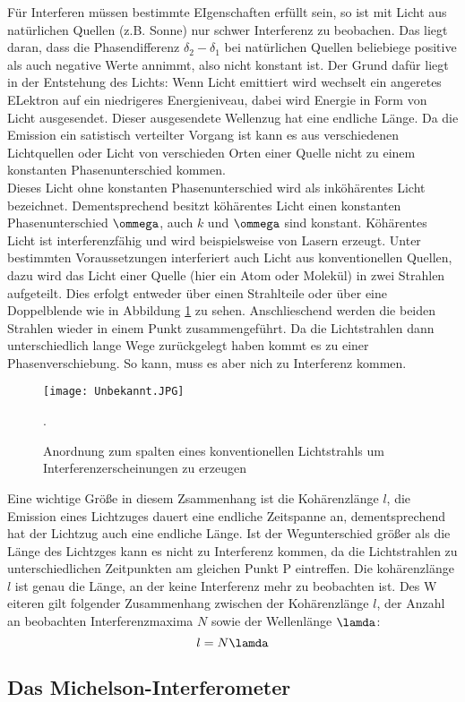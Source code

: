 Für Interferen müssen bestimmte EIgenschaften erfüllt sein, so ist mit Licht aus
natürlichen Quellen (z.B. Sonne) nur schwer Interferenz zu beobachen. Das liegt daran, dass
die Phasendifferenz $\delta_2-\delta_1$ bei natürlichen Quellen beliebiege positive als
auch negative Werte annimmt, also nicht konstant ist. Der Grund dafür liegt in der
Entstehung des Lichts: Wenn Licht emittiert wird wechselt ein angeretes ELektron auf ein
niedrigeres Energieniveau, dabei wird Energie in Form von Licht ausgesendet. Dieser ausgesendete
Wellenzug hat eine endliche Länge. Da die Emission ein satistisch verteilter Vorgang ist
kann es aus verschiedenen Lichtquellen oder Licht von verschieden Orten einer Quelle nicht zu
einem konstanten Phasenunterschied kommen.\\

Dieses Licht ohne konstanten Phasenunterschied wird als inköhärentes Licht bezeichnet.
Dementsprechend besitzt köhärentes Licht einen konstanten Phasenunterschied $\ommega$, auch
$k$ und $\ommega$ sind konstant.
Köhärentes Licht ist interferenzfähig und wird beispielsweise von Lasern erzeugt.
Unter bestimmten Voraussetzungen interferiert auch Licht aus konventionellen Quellen,
dazu wird das Licht einer Quelle (hier ein Atom oder Molekül) in zwei Strahlen aufgeteilt.
Dies erfolgt entweder über einen Strahlteile oder über eine Doppelblende wie in
Abbildung \ref{fig:blende} zu sehen. Anschlieschend werden die beiden Strahlen wieder in
einem Punkt zusammengeführt. Da die Lichtstrahlen dann unterschiedlich lange Wege zurückgelegt haben
kommt es zu einer Phasenverschiebung. So kann, muss es aber nich zu Interferenz kommen.
\begin{figure}[H]
  \centering
  \texttt{[image: Unbekannt.JPG]}
  \caption{Anordnung zum spalten eines konventionellen Lichtstrahls um Interferenzerscheinungen zu erzeugen}
  \label{fig:blende}.
\end{figure}
Eine wichtige Größe in diesem Zsammenhang ist die Kohärenzlänge $l$, die Emission eines 
Lichtzuges dauert eine endliche Zeitspanne an, dementsprechend hat der Lichtzug auch eine
endliche Länge. Ist der Wegunterschied größer als die Länge des Lichtzges kann es nicht zu
Interferenz kommen, da die Lichtstrahlen zu unterschiedlichen Zeitpunkten am gleichen
Punkt P eintreffen. Die kohärenzlänge $l$ ist genau die Länge, an der keine Interferenz mehr zu
beobachten ist. Des W eiteren gilt folgender Zusammenhang zwischen der Kohärenzlänge $l$, der Anzahl an
beobachten Interferenzmaxima $N$ sowie der Wellenlänge $\lamda$:
\begin{equation}
  l=N\lamda
  \label{eqn:interf}
\end{equation}

\subsection{Das Michelson-Interferometer}









\label{sec:Theorie}

